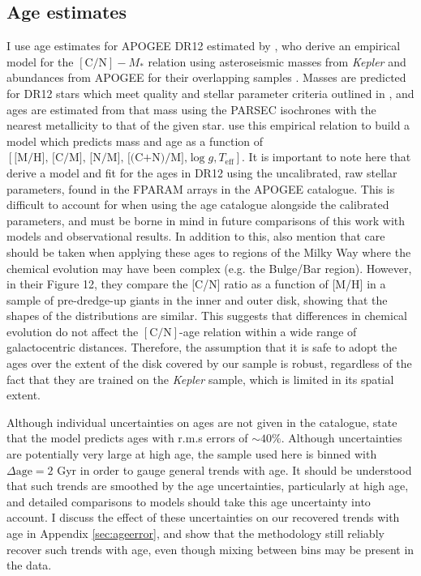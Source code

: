  \subsection{Age estimates}
 \label{sec:ages}
I use age estimates for APOGEE DR12 estimated by \citet{2016MNRAS.456.3655M}, who derive an empirical model for the $\mathrm{[C/N]} -M_*$ relation using asteroseismic masses from \emph{Kepler} and abundances from APOGEE for their overlapping samples \citep[APOKASC ][]{2014ApJS..215...19P}. Masses are predicted for DR12 stars which meet quality and stellar parameter criteria outlined in \citet{2016MNRAS.456.3655M}, and ages are estimated from that mass using the PARSEC isochrones with the nearest metallicity to that of the given star. \citet{2016MNRAS.456.3655M} use this empirical relation to build a model which predicts mass and age as a function of $[\text{[M/H], [C/M], [N/M], [(C+N)/M],}\log{g},T_{\mathrm{eff}}]$. It is important to note here that \citet{2016MNRAS.456.3655M} derive a model and fit for the ages in DR12 using the uncalibrated, raw stellar parameters, found in the FPARAM arrays in the APOGEE catalogue. This is difficult to account for when using the age catalogue alongside the calibrated parameters, and must be borne in mind in future comparisons of this work with models and observational results. In addition to this, \citet{2016MNRAS.456.3655M} also mention that care should be taken when applying these ages to regions of the Milky Way where the chemical evolution may have been complex (e.g. the Bulge/Bar region). However, in their Figure 12, they compare the [C/N] ratio as a function of [M/H] in a sample of pre-dredge-up giants in the inner and outer disk, showing that the shapes of the distributions are similar. This suggests that differences in chemical evolution do not affect the $\mathrm{[C/N]}$-age relation within a wide range of galactocentric distances. Therefore, the assumption that it is safe to adopt the \citet{2016MNRAS.456.3655M} ages over the extent of the disk covered by our sample is robust, regardless of the fact that they are trained on the \emph{Kepler} sample, which is limited in its spatial extent.

 Although individual uncertainties on ages are not given in the catalogue, \citet{2016MNRAS.456.3655M} state that the model predicts ages with r.m.s errors of $\sim 40\%$. Although uncertainties are potentially very large at high age, the sample used here is binned with $\Delta \text{age}= 2$ Gyr in order to gauge general trends with age. It should be understood that such trends are smoothed by the age uncertainties, particularly at high age, and detailed comparisons to models should take this age uncertainty into account. I discuss the effect of these uncertainties on our recovered trends with age in Appendix \ref{sec:ageerror}, and show that the methodology still reliably recover such trends with age, even though mixing between bins may be present in the data.

